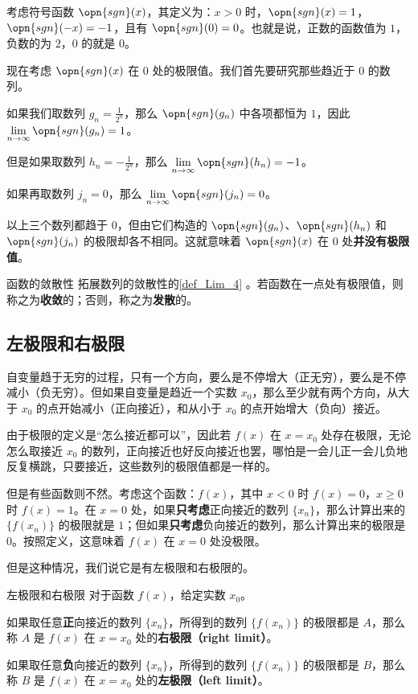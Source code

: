 \begin{example}{}\label{ex_Lim_2}
考虑符号函数 $\opn{sgn}(x)$，其定义为：$x>0$ 时，$\opn{sgn}(x)=1$，$\opn{sgn}(-x)=-1$，且有 $\opn{sgn}(0)=0$。也就是说，正数的函数值为 $1$，负数的为 $2$，$0$ 的就是 $0$。

现在考虑 $\opn{sgn}(x)$ 在 $0$ 处的极限值。我们首先要研究那些趋近于 $0$ 的数列。

如果我们取数列 $g_n=\frac{1}{2^n}$，那么 $\opn{sgn}(g_n)$ 中各项都恒为 $1$，因此 $\lim\limits_{n\to\infty}\opn{sgn}(g_n)=1$。

但是如果取数列 $h_n=-\frac{1}{2^n}$，那么 $\lim\limits_{n\to\infty}\opn{sgn}(h_n)=-1$。

如果再取数列 $j_n=0$，那么 $\lim\limits_{n\to\infty}\opn{sgn}(j_n)=0$。

以上三个数列都趋于 $0$，但由它们构造的 $\opn{sgn}(g_n)$、$\opn{sgn}(h_n)$ 和 $\opn{sgn}(j_n)$ 的极限却各不相同。这就意味着 $\opn{sgn}(x)$ 在 $0$ 处\textbf{并没有极限值}。
\end{example}

\begin{definition}{函数的敛散性}
拓展数列的敛散性的\autoref{def_Lim_4} 。若函数在一点处有极限值，则称之为\textbf{收敛}的；否则，称之为\textbf{发散}的。
\end{definition}

\subsection{左极限和右极限}

自变量趋于无穷的过程，只有一个方向，要么是不停增大（正无穷），要么是不停减小（负无穷）。但如果自变量是趋近一个实数 $x_0$，那么至少就有两个方向，从大于 $x_0$ 的点开始减小（正向接近），和从小于 $x_0$ 的点开始增大（负向）接近。

由于极限的定义是“怎么接近都可以”，因此若 $f(x)$ 在 $x=x_0$ 处存在极限，无论怎么取接近 $x_0$ 的数列，正向接近也好反向接近也罢，哪怕是一会儿正一会儿负地反复横跳，只要接近，这些数列的极限值都是一样的。

但是有些函数则不然。考虑这个函数：$f(x)$，其中 $x<0$ 时 $f(x)=0$，$x\geq 0$ 时 $f(x)=1$。在 $x=0$ 处，如果\textbf{只考虑}正向接近的数列 $\{x_n\}$，那么计算出来的 $\{f(x_n)\}$ 的极限就是 $1$；但如果\textbf{只考虑}负向接近的数列，那么计算出来的极限是 $0$。按照定义，这意味着 $f(x)$ 在 $x=0$ 处没极限。

但是这种情况，我们说它是有左极限和右极限的。

\begin{definition}{左极限和右极限}
对于函数 $f(x)$，给定实数 $x_0$。

如果取任意\textbf{正}向接近的数列 $\{x_n\}$，所得到的数列 $\{f(x_n)\}$ 的极限都是 $A$，那么称 $A$ 是 $f(x)$ 在 $x=x_0$ 处的\textbf{右极限（right limit）}。

如果取任意\textbf{负}向接近的数列 $\{x_n\}$，所得到的数列 $\{f(x_n)\}$ 的极限都是 $B$，那么称 $B$ 是 $f(x)$ 在 $x=x_0$ 处的\textbf{左极限（left limit）}。
\end{definition}


